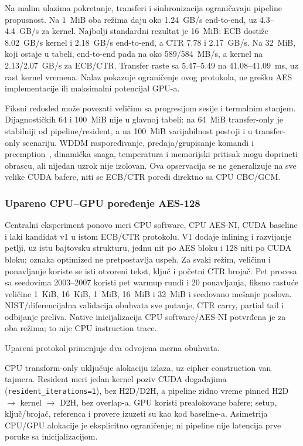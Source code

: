 Na malim ulazima pokretanje, transferi i sinhronizacija ograničavaju
pipeline propusnost. Na 1~MiB oba režima daju oko 1.24~GB/s end-to-end,
uz 4.3--4.4~GB/s za kernel. Najbolji standardni rezultat je 16~MiB:
ECB dostiže 8.02~GB/s kernel i 2.18~GB/s end-to-end, a CTR 7.78 i
2.17~GB/s. Na 32~MiB, koji ostaje u tabeli, end-to-end pada na oko
589/584~MB/s, a kernel na 2.13/2.07~GB/s za ECB/CTR. Transfer raste sa
5.47--5.49 na 41.08--41.09~ms, uz rast kernel vremena. Nalaz pokazuje
ograničenje ovog protokola, ne grešku AES implementacije ili maksimalni
potencijal GPU-a.

Fiksni redosled može povezati veličinu sa progresijom sesije i termalnim
stanjem. Dijagnostičkih 64 i 100~MiB nije u glavnoj tabeli: na 64~MiB
transfer-only je stabilniji od pipeline/resident, a na 100~MiB varijabilnost
postoji i u transfer-only scenariju. WDDM raspoređivanje, predaja/grupisanje
komandi i preemption~\cite{microsoft-wddm-scheduling,microsoft-gpu-preemption},
dinamička snaga, temperatura i memorijski pritisak mogu doprineti obrascu,
ali nijedan uzrok nije izolovan. Ova opservacija se ne generalizuje na
sve velike CUDA bafere, niti se ECB/CTR poredi direktno sa CPU CBC/GCM.

\subsubsection{Upareno CPU--GPU poređenje AES-128}
\label{sec:cpu-gpu-poredjenje}
\label{sec:rezultati-cpu-gpu-final}
Centralni eksperiment ponovo meri CPU software, CPU AES-NI, CUDA baseline
i laki kandidat v1 u istom ECB/CTR protokolu. V1 dodaje inlining i
razvijanje petlji, uz istu bajtovsku strukturu, jednu nit po AES bloku i
128 niti po CUDA bloku; oznaka optimized ne pretpostavlja uspeh.
Za svaki režim, veličinu i ponavljanje koriste se isti otvoreni tekst,
ključ i početni CTR brojač. Pet procesa sa seedovima 2003--2007 koristi
pet warmup rundi i 20 ponavljanja, fiksno rastuće veličine 1~KiB,
16~KiB, 1~MiB, 16~MiB i 32~MiB i seedovano mešanje poslova.
NIST/diferencijalna validacija obuhvata sve putanje, CTR carry, partial
tail i odbijanje preliva. Native inicijalizacija CPU software/AES-NI
potvrđena je za oba režima; to nije CPU instruction trace.

Upareni protokol primenjuje dva odvojena merna obuhvata.

CPU transform-only uključuje alokaciju izlaza, uz cipher construction
van tajmera. Resident meri jedan kernel poziv CUDA događajima
(\texttt{resident\_iterations=1}), bez H2D/D2H, a pipeline zidno vreme
pinned H2D $\rightarrow$ kernel $\rightarrow$ D2H, bez overlap-a.
GPU koristi prealokovane bafere; setup, ključ/brojač, referenca i provere
izuzeti su kao kod baseline-a. Asimetrija CPU/GPU alokacije je eksplicitno
ograničenje; ni pipeline nije latencija prve poruke sa inicijalizacijom.

